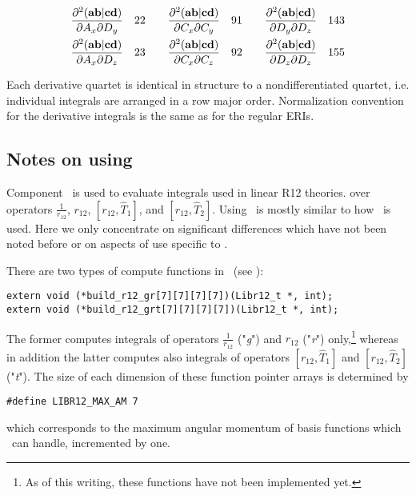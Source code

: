 \documentclass[12pt]{article}
\begin{document}
\begin{scriptsize}
\begin{eqnarray}
\frac{\partial^2 ({\bf ab}|{\bf cd})}{\partial A_x \partial D_y} \quad 22 \quad \quad \frac{\partial^2 ({\bf ab}|{\bf cd})}{\partial C_x \partial C_y} \quad 91 \quad \quad 
\frac{\partial^2 ({\bf ab}|{\bf cd})}{\partial D_y \partial D_z} \quad 143 \nonumber \\
\frac{\partial^2 ({\bf ab}|{\bf cd})}{\partial A_x \partial D_z} \quad 23 \quad \quad \frac{\partial^2 ({\bf ab}|{\bf cd})}{\partial C_x \partial C_z} \quad 92 \quad \quad 
\frac{\partial^2 ({\bf ab}|{\bf cd})}{\partial D_z \partial D_z} \quad 155 \nonumber
\end{eqnarray}
\end{scriptsize}

Each derivative quartet is identical in structure to a nondifferentiated
quartet, i.e. individual integrals are arranged in a row major order. Normalization convention
for the derivative integrals is the same as for the regular ERIs.

\subsection{Notes on using \librij}
Component \librij\ is used to evaluate integrals used in linear R12 theories\cite{Kutzelnigg85,Kutzelnigg91,Klopper92,Valeev00:r12ints}.
over operators $\frac{1}{r_{12}}$, $r_{12}$, $[r_{12},\hat{T}_1]$, and $[r_{12},\hat{T}_2]$. 
Using \librij\ is mostly similar to how \libint\ is used. Here we only concentrate on significant
differences which have not been noted before or on aspects of use specific to \librij .

There are two types of compute functions in \librij\ (see \librijh):
\begin{verbatim}
extern void (*build_r12_gr[7][7][7][7])(Libr12_t *, int);
extern void (*build_r12_grt[7][7][7][7])(Libr12_t *, int);
\end{verbatim}
The former computes integrals of operators $\frac{1}{r_{12}}$ ("{\em g}") and $r_{12}$ ("{\em r}") only,\footnote{As of this writing,
these functions have not been implemented yet.}
whereas in addition the latter computes also integrals of operators $[r_{12},\hat{T}_1]$ and $[r_{12},\hat{T}_2]$ ("{\em t}").
The size of each dimension of these function pointer arrays is determined by
\begin{verbatim}
#define LIBR12_MAX_AM 7
\end{verbatim}
which corresponds to the maximum angular momentum of basis functions which \librij\ can handle, incremented by one.
\end{document}
